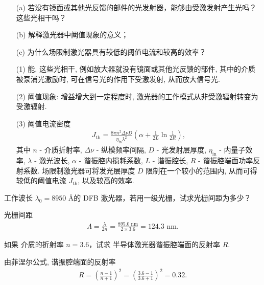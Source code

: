 \documentclass{assignment}
\begin{document}
\begin{prob}
    \begin{itemize}
        \item[(a)] 若没有镜面或其他光反馈的部件的光发射器，能够由受激发射产生光吗？这些光相干吗？
        \item[(b)] 解释激光器中阈值现象的意义；
        \item[(c)] 为什么场限制激光器具有较低的阈值电流和较高的效率？
    \end{itemize}
\end{prob}
\begin{ans}
    \begin{itemize}
        \item[(1)] 能, 这些光相干, 例如放大器就没有镜面或其他光反馈的部件, 其中的介质被泵浦光激励时, 可在信号光的作用下受激发射, 从而放大信号光.
        \item[(2)] 阈值现象: 增益增大到一定程度时, 激光器的工作模式从非受激辐射转变为受激辐射.
        \item[(3)] 阈值电流密度
        \begin{align}
            J_{\text{th}}=\frac{8\pi n^2\Delta\nu D}{\eta_{\text{in}}\lambda^2}\left(\alpha+\frac{1}{2L}\ln\frac{1}{2R}\right),
        \end{align}
        其中 $n$ - 介质折射率, $\Delta\nu$ - 纵模频率间隔, $D$ - 光发射层厚度, $\eta_{\text{in}}$ - 内量子效率, $\lambda$ - 激光波长, $\alpha$ - 谐振腔内损耗系数, $L$ - 谐振腔长, $R$ - 谐振腔端面功率反射系数. 场限制激光器可将发光层厚度 $D$ 限制在一个较小的范围内, 从而可得较低的阈值电流 $J_{\text{th}}$, 以及较高的效率.
    \end{itemize}
\end{ans}

\begin{prob}
    工作波长 $\lambda_0=8950$ \AA 的  DFB 激光器，若用一级光栅，试求光栅间距为多少？
\end{prob}
\begin{sol}
    光栅间距
    \begin{align}
        \Lambda=\frac{\lambda}{2n}=\frac{895.0\text{ nm}}{2\times 3.6}=124.3\text{ nm}.
    \end{align}
\end{sol}

\begin{prob}
    如果  介质的折射率 $n=3.6$，试求  半导体激光器谐振腔端面的反射率 $R$.
\end{prob}
\begin{sol}
    由菲涅尔公式, 谐振腔端面的反射率
    \begin{align}
        R=\left(\frac{n-1}{n+1}\right)^2=\left(\frac{3.6-1}{3.6+1}\right)^2=0.32.
    \end{align}
\end{sol}
\end{document}
